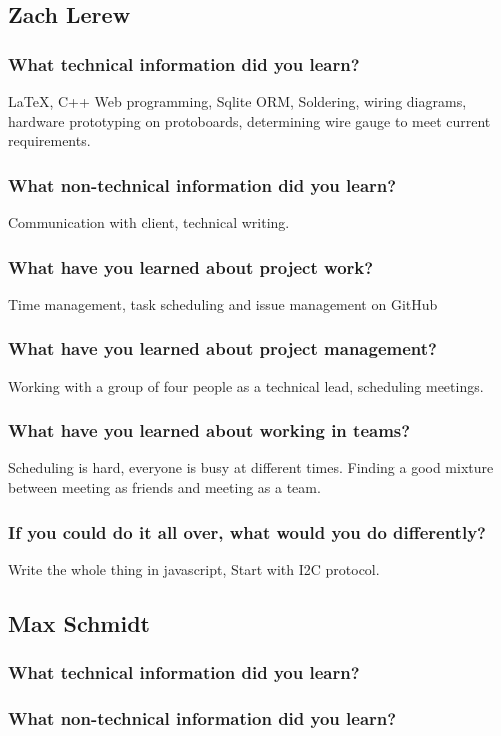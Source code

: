 \documentclass[onecolumn, draftclsnofoot,10pt, compsoc]{IEEEtran}
\begin{document}
		\subsection{Zach Lerew}
			\subsubsection{What technical information did you learn?}
			LaTeX, C++ Web programming, Sqlite ORM, Soldering, wiring diagrams, hardware prototyping on protoboards, determining wire gauge to meet current requirements.
 			\subsubsection{What non-technical information did you learn?}
			Communication with client, technical writing.
 			\subsubsection{What have you learned about project work?}
			Time management, task scheduling and issue management on GitHub
 			\subsubsection{What have you learned about project management?}
			Working with a group of four people as a technical lead, scheduling meetings.
 			\subsubsection{What have you learned about working in teams?}
			Scheduling is hard, everyone is busy at different times. Finding a good mixture between meeting as friends and meeting as a team.
 			\subsubsection{If you could do it all over, what would you do differently?}
			Write the whole thing in javascript, Start with I2C protocol.
		\subsection{Max Schmidt}
			\subsubsection{What technical information did you learn?}
			\subsubsection{What non-technical information did you learn?}
\end{document}
